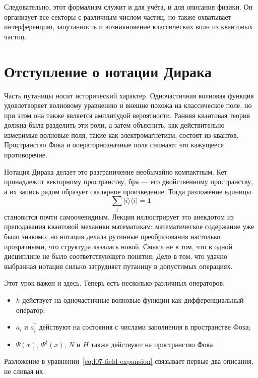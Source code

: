 Следовательно, этот формализм служит и для учёта, и для описания физики. Он организует все секторы с различным числом частиц, но также охватывает интерференцию, запутанность и возникновение классических волн из квантовых частиц.

\begin{classroomqa}
\end{classroomqa}

\section{Отступление о нотации Дирака}

Часть путаницы носит исторический характер. Одночастичная волновая функция удовлетворяет волновому уравнению и внешне похожа на классическое поле, но при этом она также является амплитудой вероятности. Ранняя квантовая теория должна была разделить эти роли, а затем объяснить, как действительно измеримые волновые поля, такие как электромагнетизм, состоят из квантов. Пространство Фока и операторнозначные поля снимают это кажущееся противоречие.

Нотация Дирака делает это разграничение необычайно компактным. Кет принадлежит векторному пространству, бра — его двойственному пространству, а их запись рядом образует скалярное произведение. Тогда разложение единицы
\begin{equation}
\sum_i|i\rangle\langle i|=\mathbf 1
\end{equation}
становится почти самоочевидным. Лекция иллюстрирует это анекдотом из преподавания квантовой механики математикам: математическое содержание уже было знакомо, но нотация делала рутинные преобразования настолько прозрачными, что структура казалась новой. Смысл не в том, что в одной дисциплине не было соответствующего понятия. Дело в том, что удачно выбранная нотация сильно затрудняет путаницу в допустимых операциях.

Этот урок важен и здесь. Теперь есть несколько различных операторов:
\begin{itemize}
\item \(h\) действует на одночастичные волновые функции как дифференциальный оператор;
\item \(a_i\) и \(a_i^\dagger\) действуют на состояния с числами заполнения в пространстве Фока;
\item \(\Psi(x)\), \(\Psi^\dagger(x)\), \(N\) и \(H\) также действуют на пространство Фока.
\end{itemize}
Разложение в уравнении~\eqref{eq:l07-field-expansion} связывает первые два описания, не сливая их.

